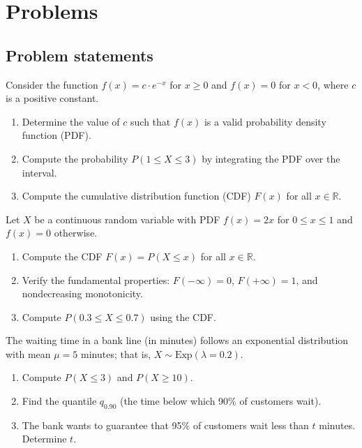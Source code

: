 \section*{Problems}

\subsection*{Problem statements}

\begin{problema}
	\label{prob:14b3125}
	Consider the function $f(x) = c \cdot e^{-x}$ for $x \ge 0$ and $f(x) = 0$ for $x < 0$, where $c$ is a positive constant.
	\begin{enumerate}
		\item Determine the value of $c$ such that $f(x)$ is a valid probability density function (PDF).
		\item Compute the probability $P(1 \le X \le 3)$ by integrating the PDF over the interval.
		\item Compute the cumulative distribution function (CDF) $F(x)$ for all $x \in \mathbb{R}$.
	\end{enumerate}
\end{problema}

\begin{problema}
	\label{prob:287c45c}
	Let $X$ be a continuous random variable with PDF $f(x) = 2x$ for $0 \le x \le 1$ and $f(x) = 0$ otherwise.
	\begin{enumerate}
		\item Compute the CDF $F(x) = P(X \le x)$ for all $x \in \mathbb{R}$.
		\item Verify the fundamental properties: $F(-\infty) = 0$, $F(+\infty) = 1$, and nondecreasing monotonicity.
		\item Compute $P(0.3 \le X \le 0.7)$ using the CDF.
	\end{enumerate}
\end{problema}

\begin{problema}
	\label{prob:61a9dd8}
	The waiting time in a bank line (in minutes) follows an exponential distribution with mean $\mu = 5$ minutes; that is, $X \sim \text{Exp}(\lambda = 0.2)$.
	\begin{enumerate}
		\item Compute $P(X \le 3)$ and $P(X \ge 10)$.
		\item Find the quantile $q_{0.90}$ (the time below which 90\% of customers wait).
		\item The bank wants to guarantee that 95\% of customers wait less than $t$ minutes. Determine $t$.
	\end{enumerate}
\end{problema}

